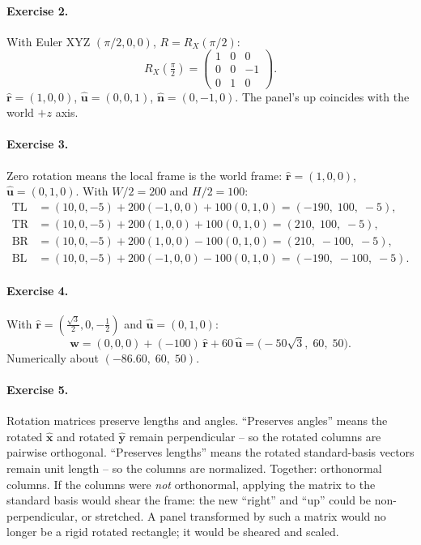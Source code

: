 \documentclass{article}
\begin{document}
\paragraph{Exercise 2.}
With Euler XYZ $(\pi/2, 0, 0)$, $R = R_X(\pi/2)$:
\[
    R_X(\tfrac{\pi}{2}) =
    \begin{pmatrix} 1 & 0 & 0 \\ 0 & 0 & -1 \\ 0 & 1 & 0 \end{pmatrix}.
\]
$\hat{\mathbf{r}} = (1, 0, 0)$,
$\hat{\mathbf{u}} = (0, 0, 1)$,
$\hat{\mathbf{n}} = (0, -1, 0)$.
The panel's up coincides with the world $+z$ axis.

\paragraph{Exercise 3.}
Zero rotation means the local frame is the world frame:
$\hat{\mathbf{r}} = (1,0,0)$, $\hat{\mathbf{u}} = (0,1,0)$.
With $W/2 = 200$ and $H/2 = 100$:
\begin{align*}
    \text{TL} &= (10,0,-5) + 200(-1,0,0) + 100(0,1,0) = (-190,\; 100,\; -5), \\
    \text{TR} &= (10,0,-5) + 200(1,0,0) + 100(0,1,0)  = (210,\;  100,\; -5), \\
    \text{BR} &= (10,0,-5) + 200(1,0,0) - 100(0,1,0)  = (210,\; -100,\; -5), \\
    \text{BL} &= (10,0,-5) + 200(-1,0,0) - 100(0,1,0) = (-190,\; -100,\; -5).
\end{align*}

\paragraph{Exercise 4.}
With $\hat{\mathbf{r}} = (\tfrac{\sqrt{3}}{2}, 0, -\tfrac{1}{2})$ and
$\hat{\mathbf{u}} = (0, 1, 0)$:
\[
    \mathbf{w} = (0,0,0) + (-100)\,\hat{\mathbf{r}} + 60\,\hat{\mathbf{u}}
              = \bigl(-50\sqrt{3},\; 60,\; 50\bigr).
\]
Numerically about $(-86.60,\; 60,\; 50)$.

\paragraph{Exercise 5.}
Rotation matrices preserve lengths and angles. ``Preserves angles'' means
the rotated $\hat{\mathbf{x}}$ and rotated $\hat{\mathbf{y}}$ remain
perpendicular -- so the rotated columns are pairwise orthogonal.
``Preserves lengths'' means the rotated standard-basis vectors remain unit
length -- so the columns are normalized. Together: orthonormal columns.
If the columns were \emph{not} orthonormal, applying the matrix to the
standard basis would shear the frame: the new ``right'' and ``up'' could be
non-perpendicular, or stretched. A panel transformed by such a matrix would
no longer be a rigid rotated rectangle; it would be sheared and scaled.
\end{document}
